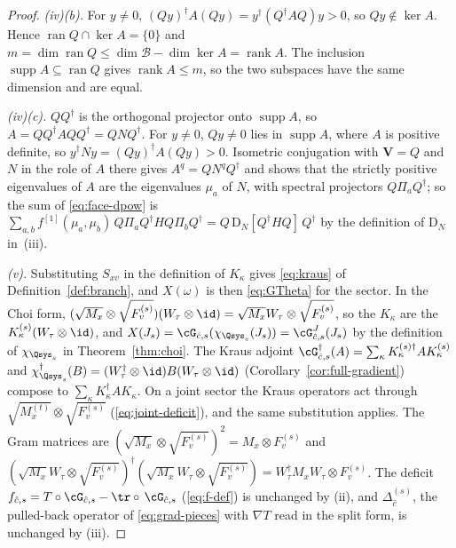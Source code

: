 \begin{proof}
\emph{(iv)(b).} For $y\ne0$,
$(Qy)^{\dagger}A(Qy)=y^{\dagger}(Q^{\dagger}AQ)y>0$, so $Qy\notin\ker A$.
Hence $\operatorname{ran}Q\cap\ker A=\{0\}$ and
$m=\dim\operatorname{ran}Q\le\dim\mathcal{B}-\dim\ker A
=\operatorname{rank}A$. The inclusion
$\operatorname{supp}A\subseteq\operatorname{ran}Q$ gives
$\operatorname{rank}A\le m$, so the two subspaces have the same dimension and
are equal.

\emph{(iv)(c).} $QQ^{\dagger}$ is the orthogonal projector onto
$\operatorname{supp}A$, so $A=QQ^{\dagger}AQQ^{\dagger}=QNQ^{\dagger}$. For
$y\ne0$, $Qy\ne0$ lies in $\operatorname{supp}A$, where $A$ is positive
definite, so $y^{\dagger}Ny=(Qy)^{\dagger}A(Qy)>0$. Isometric conjugation
with $\mathbf V=Q$ and $N$ in the role of $A$ there gives
$A^{q}=QN^{q}Q^{\dagger}$ and shows that
the strictly positive eigenvalues of $A$ are the eigenvalues $\mu_a$ of $N$,
with spectral projectors $Q\Pi_aQ^{\dagger}$; so the sum of
\eqref{eq:face-dpow} is $\sum_{a,b}f^{[1]}(\mu_a,\mu_b)\,Q\Pi_aQ^{\dagger}H
Q\Pi_bQ^{\dagger}=Q\,\mathrm{D}_N[Q^{\dagger}HQ]\,Q^{\dagger}$ by the
definition of $\mathrm{D}_N$ in
\,(iii).

\emph{(v).} Substituting $S_{xv}$ in the definition of $K_{\kappa}$ gives
\eqref{eq:kraus} of Definition~\ref{def:branch}, and $X(\omega)$ is then
\eqref{eq:GTheta} for the sector. In the Choi form,
$(\sqrt{M_x}\otimes\sqrt{F^{(s)}_v})(W_{\tau}\otimes\id)
=\sqrt{M_x}W_{\tau}\otimes\sqrt{F^{(s)}_v}$, so the $K_{\kappa}$ are the
$K^{(s)}_{\kappa}(W_{\tau}\otimes\id)$, and $X(J_s)=\cG_{\hat c,s}
(\chi_{\Qsys_s}(J_s))=\cG^{J}_{\hat c,s}(J_s)$ by the definition of
$\chi_{\Qsys_s}$ in Theorem~\ref{thm:choi}. The Kraus adjoint
$\cG^{\dagger}_{\hat c,s}(A)=\sum_{\kappa}K^{(s)\dagger}_{\kappa}AK^{(s)}_{\kappa}$
and $\chi^{\dagger}_{\Qsys_s}(B)=(W_{\tau}^{\dagger}\otimes\id)B
(W_{\tau}\otimes\id)$ (Corollary~\ref{cor:full-gradient}) compose to
$\sum_{\kappa}K_{\kappa}^{\dagger}AK_{\kappa}$. On a joint sector the Kraus
operators act through $\sqrt{M^{(t)}_x}\otimes\sqrt{F^{(s)}_v}$
(\eqref{eq:joint-deficit}), and the same substitution applies. The Gram
matrices are $(\sqrt{M_x}\otimes\sqrt{F^{(s)}_v})^{2}=M_x\otimes F^{(s)}_v$
and $(\sqrt{M_x}W_{\tau}\otimes\sqrt{F^{(s)}_v})^{\dagger}
(\sqrt{M_x}W_{\tau}\otimes\sqrt{F^{(s)}_v})
=W_{\tau}^{\dagger}M_xW_{\tau}\otimes F^{(s)}_v$. The deficit
$f_{\hat c,s}=T\circ\cG_{\hat c,s}-\tr\circ\,\cG_{\hat c,s}$
(\eqref{eq:f-def}) is unchanged by (ii), and $\Delta^{(s)}_{\hat c}$, the
pulled-back operator of \eqref{eq:grad-pieces} with $\nabla T$ read in the
split form, is unchanged by (iii).
\end{proof}
